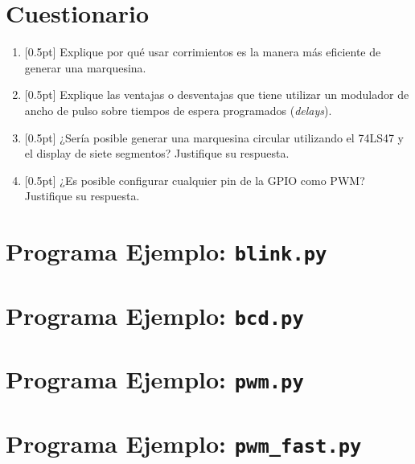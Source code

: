 \documentclass[letterpaper,10.5pt]{article}
\begin{document}
%
%
\section{Cuestionario}%
\label{sec:questionnaire}
\begin{enumerate}
	\item{} [0.5pt] Explique por qué usar corrimientos es la manera más eficiente de generar una marquesina.
	\item{} [0.5pt] Explique las ventajas o desventajas que tiene utilizar un modulador de ancho de pulso sobre tiempos de espera programados (\emph{delays}).
	\item{} [0.5pt] ¿Sería posible generar una marquesina circular utilizando el 74LS47 y el display de siete segmentos? Justifique su respuesta.
	\item{} [0.5pt] ¿Es posible configurar cualquier pin de la GPIO como PWM? Justifique su respuesta.
\end{enumerate}

\appendix

\cleardoublepage
\section{Programa Ejemplo: \texttt{blink.py}}%
\label{sec:appendix1}


\section{Programa Ejemplo: \texttt{bcd.py}}%
\label{sec:appendix2}


\cleardoublepage
\section{Programa Ejemplo: \texttt{pwm.py}}%
\label{sec:appendix3}


\section{Programa Ejemplo: \texttt{pwm\_fast.py}}%
\label{sec:appendix3}
\end{document}
